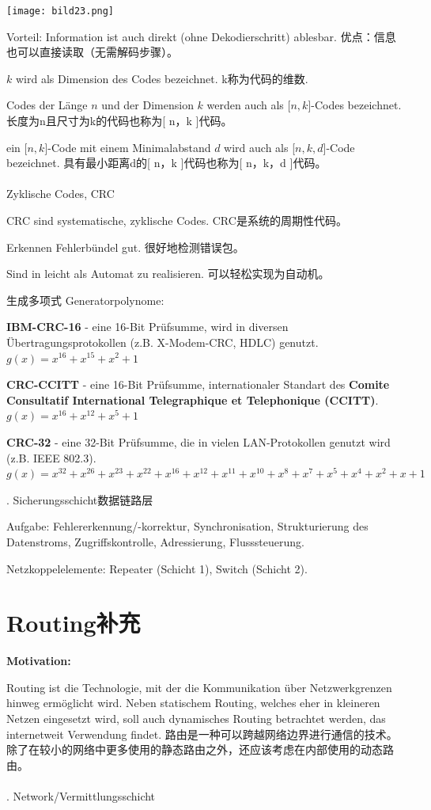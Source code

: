 \documentclass[fleqn]{article}
\begin{document}
\begin{center}
    \texttt{[image: bild23.png]}
\end{center}

Vorteil: Information ist auch direkt (ohne Dekodierschritt) ablesbar.
优点：信息也可以直接读取（无需解码步骤）。

$k$ wird als Dimension des Codes bezeichnet.
k称为代码的维数.

Codes der Länge $n$ und der Dimension $k$ werden auch als [$n, k$]-Codes bezeichnet.
长度为n且尺寸为k的代码也称为[ n，k ]代码。

ein [$n, k$]-Code mit einem Minimalabstand $d$ wird auch als [$n, k, d$]-Code bezeichnet.
具有最小距离d的[ n，k ]代码也称为[ n，k，d ]代码。
\\
\\
 Zyklische Codes, CRC 

CRC sind systematische, zyklische Codes. CRC是系统的周期性代码。

Erkennen Fehlerbündel gut. 很好地检测错误包。

Sind in leicht als Automat zu realisieren. 可以轻松实现为自动机。

 生成多项式 Generatorpolynome:

\textbf{IBM-CRC-16} - eine 16-Bit Prüfsumme, wird in diversen Übertragungsprotokollen (z.B. X-Modem-CRC, HDLC) genutzt.
$g(x)=x^{16}+x^{15}+x^2+1$

\textbf{CRC-CCITT} - eine 16-Bit Prüfsumme, internationaler Standart des \textbf{Comite Consultatif International Telegraphique et Telephonique (CCITT)}.
$g(x)=x^{16}+x^{12}+x^5+1$

\textbf{CRC-32} - eine 32-Bit Prüfsumme, die in vielen LAN-Protokollen genutzt wird (z.B. IEEE 802.3).
$g(x)=x^{32}+x^{26}+x^{23}+x^{22}+x^{16}+x^{12}+x^{11}+x^{10}+x^{8}+x^7+x^5+x^4+x^2+x+1$

. Sicherungsschicht数据链路层

Aufgabe: Fehlererkennung/-korrektur,
Synchronisation,
Strukturierung des Datenstroms,
Zugriffskontrolle,
Adressierung,
Flusssteuerung.

Netzkoppelelemente: Repeater (Schicht 1),
Switch (Schicht 2).

\section{Routing补充}

\noindent \textbf{Motivation:}

Routing ist die Technologie, mit der die Kommunikation über Netzwerkgrenzen hinweg ermöglicht wird. Neben statischem Routing, welches eher in kleineren Netzen eingesetzt wird, soll auch dynamisches Routing betrachtet werden, das internetweit Verwendung findet.
路由是一种可以跨越网络边界进行通信的技术。除了在较小的网络中更多使用的静态路由之外，还应该考虑在内部使用的动态路由。
\\
\\
. Network/Vermittlungsschicht
\end{document}

